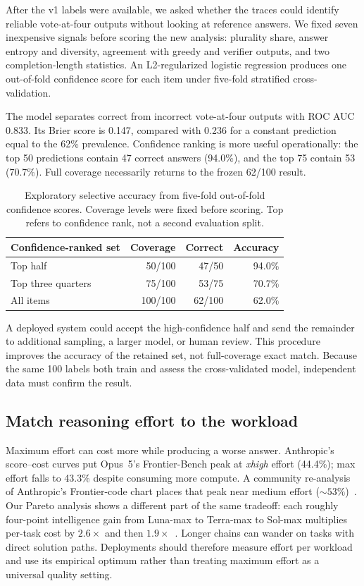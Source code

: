 \documentclass[11pt]{article}
\begin{document}
After the v1 labels were available, we asked whether the traces could identify
reliable vote-at-four outputs without looking at reference answers. We fixed
seven inexpensive signals before scoring the new analysis: plurality share,
answer entropy and diversity, agreement with greedy and verifier outputs, and
two completion-length statistics. An L2-regularized logistic regression
produces one out-of-fold confidence score for each item under five-fold
stratified cross-validation.

The model separates correct from incorrect vote-at-four outputs with ROC AUC
0.833. Its Brier score is 0.147, compared with 0.236 for a constant prediction
equal to the 62\% prevalence. Confidence ranking is more useful operationally:
the top 50 predictions contain 47 correct answers (94.0\%), and the top 75
contain 53 (70.7\%). Full coverage necessarily returns to the frozen 62/100
result.

\begin{table}[H]
\centering
\caption{Exploratory selective accuracy from five-fold out-of-fold confidence
scores. Coverage levels were fixed before scoring. Top refers to confidence
rank, not a second evaluation split.}\label{tab:mlconfidence}
\small
\begin{tabular}{lrrr}
\toprule
Confidence-ranked set & Coverage & Correct & Accuracy \\
\midrule
Top half & 50/100 & 47/50 & 94.0\% \\
Top three quarters & 75/100 & 53/75 & 70.7\% \\
All items & 100/100 & 62/100 & 62.0\% \\
\bottomrule
\end{tabular}

\end{table}

A deployed system could accept the high-confidence half and send the remainder
to additional sampling, a larger model, or human review. This procedure
improves the accuracy of the retained set, not full-coverage exact match.
Because the same 100 labels both train and assess the cross-validated model,
independent data must confirm the result.

\subsection{Match reasoning effort to the workload}\label{sec:effort}

Maximum effort can cost more while producing a worse answer. Anthropic's
score--cost curves put Opus~5's Frontier-Bench peak at \emph{xhigh} effort
(44.4\%); max effort falls to 43.3\% despite consuming more compute. A
community re-analysis of Anthropic's Frontier-code chart places that peak near
medium effort (${\sim}53\%$)~\cite{anthropic2026opus5}. Our Pareto analysis
shows a different part of the same tradeoff: each roughly four-point
intelligence gain from Luna-max to Terra-max to Sol-max multiplies per-task
cost by $2.6\times$ and then $1.9\times$~\cite{gist2026aa56}. Longer chains
can wander on tasks with direct solution paths. Deployments should therefore
measure effort per workload and use its empirical optimum rather than treating
maximum effort as a universal quality setting.
\end{document}
